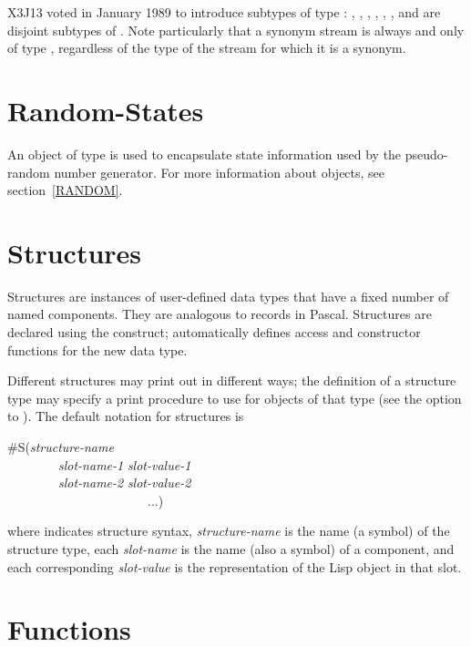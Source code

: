 \begin{newer}
X3J13 voted in January 1989
to introduce subtypes of type :
, ,
, , , ,
and  are disjoint subtypes of .
Note particularly that a synonym stream is always and only of type
, regardless of the type of the stream for which it is a synonym.
\end{newer}

\section{Random-States}

An object of type  is used to encapsulate
state information used by the pseudo-random number generator.
For more information about  objects,
see section~\ref{RANDOM}.

\section{Structures}

Structures are instances of user-defined data types that have
a fixed number of named components.  They are analogous to
records in Pascal.
Structures are declared using the  construct;
 automatically defines access and constructor functions for
the new data type.

Different structures may print out in different ways;
the definition of a structure type may specify a print procedure
to use for objects of that type (see the
 option to ).
The default notation for structures is
\begin{lisp}
\#S({\it structure-name} \\
~~~~~~~~{\it slot-name-1} {\it slot-value-1} \\
~~~~~~~~{\it slot-name-2} {\it slot-value-2} \\
~~~~~~~~~~~~~~~~~~~~~~...)
\end{lisp}
where  indicates structure syntax, {\it structure-name} is
the name (a symbol) of the structure type, each {\it slot-name} is the name
(also a symbol) of a component, and each corresponding {\it slot-value}
is the representation of the Lisp object in that slot.

\section{Functions}
\label{FUNCTION-TYPE-SECTION}

